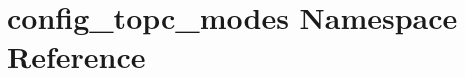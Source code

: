 \hypertarget{namespaceconfig__topc__modes}{}\section{config\+\_\+topc\+\_\+modes Namespace Reference}
\label{namespaceconfig__topc__modes}
